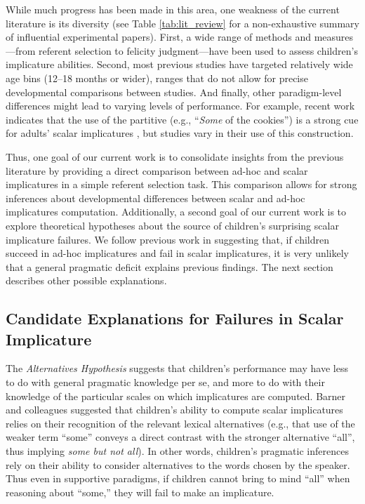 \documentclass[man]{apa2}
\begin{document}
While much progress has been made in this area, one weakness of the current literature is its diversity (see Table \ref{tab:lit_review} for a non-exhaustive summary of influential experimental papers). First, a wide range of methods and measures---from referent selection to felicity judgment---have been used to assess children's implicature abilities. Second, most previous studies have targeted relatively wide age bins (12--18 months or wider), ranges that do not allow for precise developmental comparisons between studies. And finally, other paradigm-level differences might lead to varying levels of performance. For example, recent work indicates that the use of the partitive (e.g., ``\emph{Some} of the cookies'') is a strong cue for adults' scalar implicatures \cite{degen2015b}, but studies vary in their use of this construction.

Thus, one goal of our current work is to consolidate insights from the previous literature by providing a direct comparison between ad-hoc and scalar implicatures in a simple referent selection task. This comparison allows for strong inferences about developmental differences between scalar and ad-hoc implicatures computation. Additionally, a second goal of our current work is to explore theoretical hypotheses about the source of children's surprising scalar implicature failures. We follow previous work in suggesting that, if children succeed in ad-hoc implicatures and fail in scalar implicatures, it is very unlikely that a general pragmatic deficit explains previous findings. The next section describes other possible explanations.

\subsection{Candidate Explanations for Failures in Scalar Implicature}

The \emph{Alternatives Hypothesis} suggests that children's performance may have less to do with general pragmatic knowledge per se, and more to do with their knowledge of the particular scales on which implicatures are computed. Barner and colleagues \cite{barner2010,barner2011} suggested that children's ability to compute scalar implicatures relies on their recognition of the relevant lexical alternatives (e.g., that use of the weaker term ``some'' conveys a direct contrast with the stronger alternative ``all'', thus implying \emph{some but not all}).  In other words, children's pragmatic inferences rely on their ability to consider alternatives to the words chosen by the speaker. Thus even in supportive paradigms, if children cannot bring to mind ``all'' when reasoning about ``some,'' they will fail to make an implicature.
\end{document}
